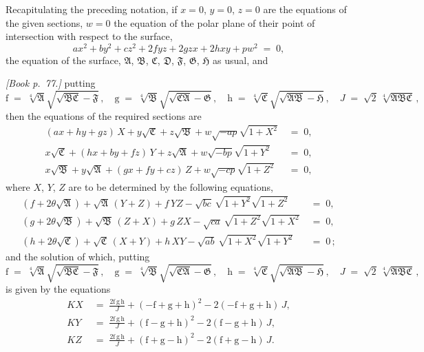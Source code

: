\documentclass[11pt]{article}
\providecommand{\fA}{\mathfrak{A}}
\providecommand{\fB}{\mathfrak{B}}
\providecommand{\fC}{\mathfrak{C}}
\providecommand{\fD}{\mathfrak{D}}
\providecommand{\fF}{\mathfrak{F}}
\providecommand{\fG}{\mathfrak{G}}
\providecommand{\fH}{\mathfrak{H}}
\begin{document}
Recapitulating the preceding notation, if $x = 0$, $y = 0$, $z = 0$ are the equations of the given sections, $w = 0$ the equation of the polar plane of their point of intersection with respect to the surface,
\[
a x^{2} + b y^{2} + c z^{2} + 2 f y z + 2 g z x + 2 h x y + p w^{2} \;=\; 0,
\]
the equation of the surface, $\fA$, $\fB$, $\fC$, $\fD$, $\fF$, $\fG$, $\fH$ as usual, and

\bigskip

\noindent\emph{[Book p.~77.]} putting
\[
\mathrm{f} \;=\; \sqrt[4]{\fA}\sqrt{\sqrt{\fB\fC} - \fF}\,,\quad \mathrm{g} \;=\; \sqrt[4]{\fB}\sqrt{\sqrt{\fC\fA} - \fG}\,,\quad \mathrm{h} \;=\; \sqrt[4]{\fC}\sqrt{\sqrt{\fA\fB} - \fH}\,,\quad J \;=\; \sqrt{2}\,\sqrt[4]{\fA\fB\fC}\,,
\]
then the equations of the required sections are
\begin{align*}
(ax + hy + gz)\,X + y\sqrt{\fC} + z\sqrt{\fB} + w\sqrt{-ap}\sqrt{1 + X^{2}} &\;=\; 0,\\
x\sqrt{\fC} + (hx + by + fz)\,Y + z\sqrt{\fA} + w\sqrt{-bp}\sqrt{1 + Y^{2}} &\;=\; 0,\\
x\sqrt{\fB} + y\sqrt{\fA} + (gx + fy + cz)\,Z + w\sqrt{-cp}\sqrt{1 + Z^{2}} &\;=\; 0,
\end{align*}
where $X$, $Y$, $Z$ are to be determined by the following equations,
\begin{align*}
(f + 2\theta\sqrt{\fA}) + \sqrt{\fA}\,(Y + Z) + f\,YZ - \sqrt{bc}\,\sqrt{1 + Y^{2}}\sqrt{1 + Z^{2}} &\;=\; 0,\\
(g + 2\theta\sqrt{\fB}) + \sqrt{\fB}\,(Z + X) + g\,ZX - \sqrt{ca}\,\sqrt{1 + Z^{2}}\sqrt{1 + X^{2}} &\;=\; 0,\\
(h + 2\theta\sqrt{\fC}) + \sqrt{\fC}\,(X + Y) + h\,XY - \sqrt{ab}\,\sqrt{1 + X^{2}}\sqrt{1 + Y^{2}} &\;=\; 0\,;
\end{align*}
and the solution of which, putting
\[
\mathrm{f} \;=\; \sqrt[4]{\fA}\sqrt{\sqrt{\fB\fC} - \fF}\,,\quad \mathrm{g} \;=\; \sqrt[4]{\fB}\sqrt{\sqrt{\fC\fA} - \fG}\,,\quad \mathrm{h} \;=\; \sqrt[4]{\fC}\sqrt{\sqrt{\fA\fB} - \fH}\,,\quad J \;=\; \sqrt{2}\,\sqrt[4]{\fA\fB\fC}\,,
\]
is given by the equations
\begin{align*}
KX &\;=\; \tfrac{2\mathrm{f}\,\mathrm{g}\,\mathrm{h}}{J} + (-\mathrm{f} + \mathrm{g} + \mathrm{h})^{2} - 2(-\mathrm{f} + \mathrm{g} + \mathrm{h})\,J,\\
KY &\;=\; \tfrac{2\mathrm{f}\,\mathrm{g}\,\mathrm{h}}{J} + ( \mathrm{f} - \mathrm{g} + \mathrm{h})^{2} - 2( \mathrm{f} - \mathrm{g} + \mathrm{h})\,J,\\
KZ &\;=\; \tfrac{2\mathrm{f}\,\mathrm{g}\,\mathrm{h}}{J} + ( \mathrm{f} + \mathrm{g} - \mathrm{h})^{2} - 2( \mathrm{f} + \mathrm{g} - \mathrm{h})\,J.
\end{align*}
\end{document}
